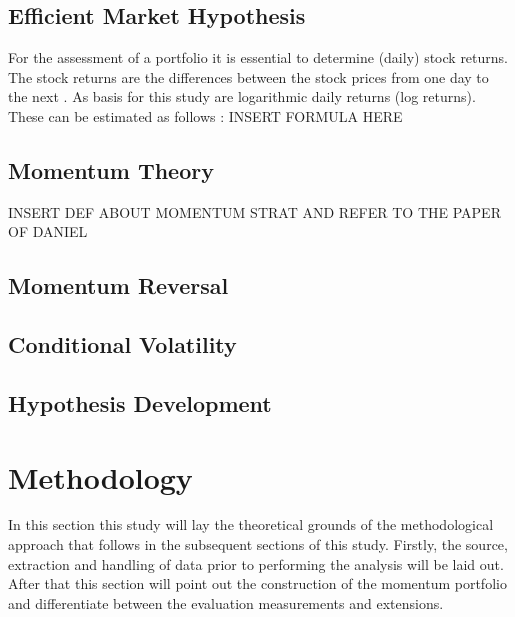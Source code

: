 \documentclass[12pt]{article}
\begin{document}
\subsection{Efficient Market Hypothesis} \label{subsection:EMH}
For the assessment of a portfolio it is essential to determine (daily) stock returns. The stock returns are the differences between the stock prices from one day to the next \parencite{Tsay2002}. As basis for this study are logarithmic daily returns (log returns). These can be estimated as follows \parencite{Tsay2002}: 
INSERT FORMULA HERE



\subsection{Momentum Theory} \label{subsection:Momentum_theory}

INSERT DEF ABOUT MOMENTUM STRAT
AND REFER TO THE PAPER OF DANIEL


\subsection{Momentum Reversal} \label{subsection:Momentum_reversal}

\subsection{Conditional Volatility} \label{subsection:condvol}


\subsection{Hypothesis Development} \label{subsection:Hypotheses}


\section{Methodology} \label{section:Method}
In this section this study will lay the theoretical grounds of the methodological approach that follows in the subsequent sections of this study. Firstly, the source, extraction and handling of data prior to performing the analysis will be laid out. After that this section will point out the construction of the momentum portfolio and differentiate between the evaluation measurements and extensions.
\end{document}
